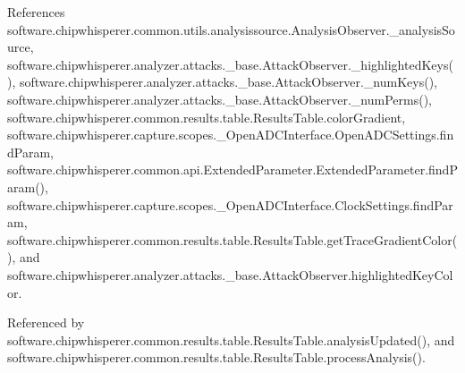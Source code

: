 References software.\+chipwhisperer.\+common.\+utils.\+analysissource.\+Analysis\+Observer.\+\_\+analysis\+Source, software.\+chipwhisperer.\+analyzer.\+attacks.\+\_\+base.\+Attack\+Observer.\+\_\+highlighted\+Keys(), software.\+chipwhisperer.\+analyzer.\+attacks.\+\_\+base.\+Attack\+Observer.\+\_\+num\+Keys(), software.\+chipwhisperer.\+analyzer.\+attacks.\+\_\+base.\+Attack\+Observer.\+\_\+num\+Perms(), software.\+chipwhisperer.\+common.\+results.\+table.\+Results\+Table.\+color\+Gradient, software.\+chipwhisperer.\+capture.\+scopes.\+\_\+\+Open\+A\+D\+C\+Interface.\+Open\+A\+D\+C\+Settings.\+find\+Param, software.\+chipwhisperer.\+common.\+api.\+Extended\+Parameter.\+Extended\+Parameter.\+find\+Param(), software.\+chipwhisperer.\+capture.\+scopes.\+\_\+\+Open\+A\+D\+C\+Interface.\+Clock\+Settings.\+find\+Param, software.\+chipwhisperer.\+common.\+results.\+table.\+Results\+Table.\+get\+Trace\+Gradient\+Color(), and software.\+chipwhisperer.\+analyzer.\+attacks.\+\_\+base.\+Attack\+Observer.\+highlighted\+Key\+Color.



Referenced by software.\+chipwhisperer.\+common.\+results.\+table.\+Results\+Table.\+analysis\+Updated(), and software.\+chipwhisperer.\+common.\+results.\+table.\+Results\+Table.\+process\+Analysis().



